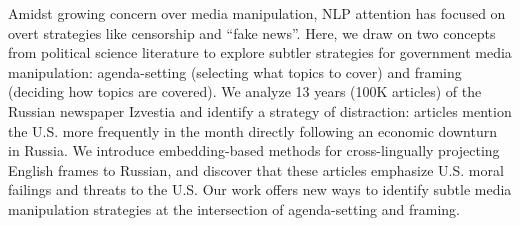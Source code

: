 Amidst growing concern over media manipulation, NLP attention has focused  on overt strategies like censorship and ``fake news''. Here, we draw on two concepts from political science literature to explore subtler strategies for government media manipulation: agenda-setting (selecting what topics to cover) and framing (deciding how topics are covered). We analyze 13 years (100K articles) of the Russian newspaper Izvestia and identify a strategy of distraction: articles mention the U.S. more frequently in the month directly following an economic downturn in Russia. We introduce embedding-based methods for cross-lingually projecting English frames to Russian, and discover that these articles emphasize U.S. moral failings and threats to the U.S. Our work offers new ways to identify subtle media manipulation strategies at the intersection of agenda-setting and framing.
